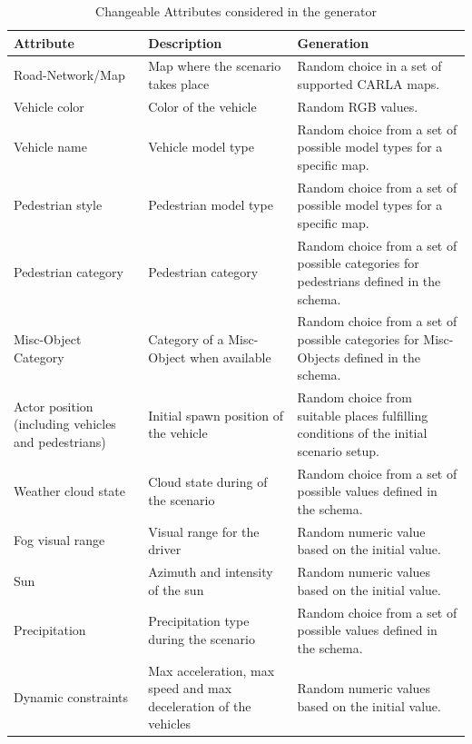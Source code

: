 \documentclass[conference, a4paper, 11pt]{IEEEtran}
\begin{document}
\begin{table}
	\renewcommand{\arraystretch}{1.2}
	\caption{Changeable Attributes considered in the generator}
	\label{attribute_table}
	\centering
	\begin{tabularx}{\linewidth}{p{2cm}|p{2cm}|p{3.5cm}}
		\hline
		\bfseries Attribute & \bfseries Description & \bfseries Generation \\
		\hline\hline
		Road-Network/Map & Map where the scenario takes place & Random choice in a set of supported CARLA maps.  \\ \hline
		Vehicle color  & Color of the vehicle & Random RGB values. \\ \hline
		Vehicle name & Vehicle model type & Random choice from  a set of possible model types for a specific map. \\ \hline
		Pedestrian style & Pedestrian model type & Random choice from  a set of possible model types for a specific map. \\ \hline
		Pedestrian category & Pedestrian category & Random choice from a set of possible categories for pedestrians defined in the schema. \\ \hline
		Misc-Object Category & Category of a Misc-Object when available & Random choice from a set of possible categories for Misc-Objects defined in the schema. \\ \hline
		Actor position (including vehicles and pedestrians) & Initial spawn position of the vehicle & Random choice from suitable places fulfilling conditions of the initial scenario setup. \\ \hline
		Weather cloud state & Cloud state during of the scenario & Random choice from a set of possible values defined in the schema. \\ \hline
		Fog visual range & Visual range for the driver & Random numeric value based on the initial value. \\ \hline
		Sun & Azimuth and intensity of the sun & Random numeric values based on the initial value. \\ \hline
		Precipitation & Precipitation type during the scenario & Random choice from a set of possible values defined in the schema. \\ \hline
		Dynamic constraints & Max acceleration, max speed and max deceleration of the vehicles  & Random numeric values based on the initial value. \\ \hline
	\end{tabularx}
\end{table}
\end{document}
